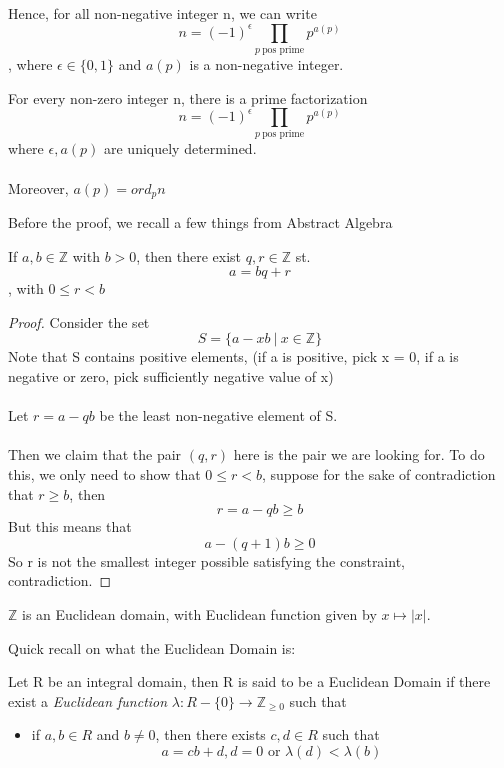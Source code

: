 \begin{remark}
Hence, for all non-negative integer n, we can write
\[n = (-1)^{\epsilon} \prod_{p\ \text{pos prime}} p^{a(p)}\]
, where $\epsilon \in \{0, 1\}$ and $a(p)$ is a non-negative integer.
\end{remark}

\begin{theorem}
For every non-zero integer n, there is a prime factorization 
\[n = (-1)^{\epsilon} \prod_{p\ \text{pos prime}} p^{a(p)}\]
where $\epsilon, a(p)$ are uniquely determined.\\\\
Moreover, $a(p) = ord_p n$
\end{theorem}

Before the proof, we recall a few things from Abstract Algebra
\begin{lemma}
If $a, b \in \mathbb{Z}$ with $b > 0$, then there exist $q, r \in \mathbb{Z}$ st.
\[a = bq + r\]
, with $0 \leq r < b$
\end{lemma}

\begin{proof}
Consider the set 
\[S = \{a - xb\ |\ x \in \mathbb{Z}\}\]
Note that S contains positive elements, (if a is positive, pick x = 0, if a is negative or zero, pick sufficiently negative value of x)\\\\
Let $r = a - qb$ be the least non-negative element of S.\\\\
Then we claim that the pair $(q, r)$ here is the pair we are looking for. To do this, we only need to show that $0 \leq r < b$, suppose for the sake of contradiction that $r \geq b$, then
\[r = a - qb \geq b\]
But this means that
\[a - (q + 1)b \geq 0\]
So r is not the smallest integer possible satisfying the constraint, contradiction.
\end{proof}

\begin{corollary}
$\mathbb{Z}$ is an Euclidean domain, with Euclidean function given by $x \mapsto |x|$.
\end{corollary}

\noindent Quick recall on what the Euclidean Domain is:
\begin{definition}
Let R be an integral domain, then R is said to be a Euclidean Domain if there exist a \textit{Euclidean function} $\lambda: R - \{0\} \to \mathbb{Z}_{\geq 0}$ such that
\begin{itemize}
    \item if $a, b \in R$ and $b \neq 0$, then there exists $c, d \in R$ such that
    \[a = cb + d, d = 0 \text{ or } \lambda(d) < \lambda(b)\]
\end{itemize}
\end{definition}

